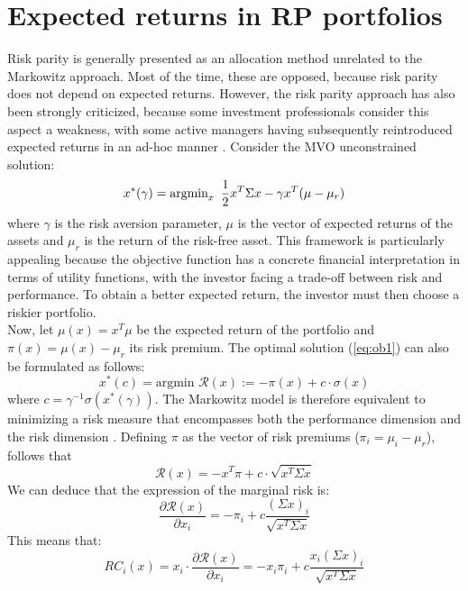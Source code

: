 \section{Expected returns in RP portfolios}
Risk parity is generally presented as an allocation method unrelated to the Markowitz approach. Most of the time, these are opposed, because risk parity does not depend on expected returns. However, the risk parity approach has also been strongly criticized, because some investment professionals consider this aspect a weakness, with some active managers having subsequently reintroduced expected returns in an ad-hoc manner \cite{intr}. Consider the MVO unconstrained solution:
\begin{equation}\label{eq:ob1}
x^*(\gamma) = \mbox{argmin}_x \enskip \frac{1}{2} x^T \Sigma x - \gamma x^T (\mu - \mu_r)
\end{equation}
where $\gamma$ is the risk aversion parameter, $\mu$ is the vector of expected returns of the assets and $\mu_r$ is the return of the risk-free asset. This framework is particularly appealing because the objective function has a concrete financial interpretation in terms of utility functions, with the investor facing a trade-off between risk and performance. To obtain a better expected return, the investor must then choose a riskier portfolio.\\
Now, let $\mu(x) = x^T \mu$ be the expected return of the portfolio and $\pi(x) = \mu(x) - \mu_r$ its risk premium. The optimal solution (\ref{eq:ob1}) can also be formulated as follows:
\begin{equation}
x^*(c) =\mbox{argmin } \mathcal{R}(x) := - \pi(x) + c \cdot \sigma(x)
\end{equation}
where $c = \gamma^{-1} \sigma(x^*(\gamma))$. The Markowitz model is therefore equivalent to minimizing a risk measure that
encompasses both the performance dimension and the risk dimension \cite{intr}. Defining $\pi$ as the vector of risk premiums ($\pi_i = \mu_i - \mu_r$), follows that
\begin{equation}\label{eq:risk2}
\mathcal{R}(x) = -x^T \pi + c \cdot \sqrt{x^T \Sigma x}
\end{equation}
We can deduce that the expression of the marginal risk is:
\begin{equation}
\frac{\partial \mathcal{R}(x)}{\partial x_i} = -\pi_i + c \frac{(\Sigma x)_i}{\sqrt{x^T \Sigma x}}
\end{equation}
This means that:
\begin{equation}
RC_i(x) = x_i \cdot \frac{\partial \mathcal{R}(x)}{\partial x_i} = -x_i\pi_i + c \frac{x_i(\Sigma x)_i}{\sqrt{x^T \Sigma x}}
\end{equation}


